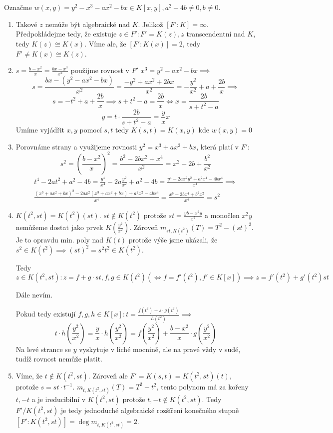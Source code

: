 \documentclass[12pt, a4paper]{article}
\begin{document}
\section{}
Označme $w(x,y)=y^2-x^3-ax^2-bx \in K[x,y], a^2-4b \neq 0, b \neq 0$.
\begin{enumerate}[label=(\alph*)]
    \item Takové $z$ nemůže být algebraické nad $K$. Jelikož $[F':K]= \infty $. Předpokládejme tedy, že existuje $z \in F': F'=K(z), z$ transcendentní nad $K$, tedy $K(z) \cong K(x)$. Víme ale, že $[F':K(x)]=2$, tedy $F' \neq K(x) \cong K(z)$.

    \item $s = \frac{b-x^2}{x} = \frac{bx-x^3}{x^2}$ použijme rovnost v $F'$ $x^3=y^2-ax^2-bx \implies$
    \[s = \frac{bx-(y^2-ax^2-bx)}{x^2} = \frac{-y^2+ax^2+2bx}{x^2}=-\frac{y^2}{x^2}+a+\frac{2b}{x} \implies
    \]
    \[
    s = -t^2+a+\frac{2b}{x} \implies s+t^2-a = \frac{2b}{x} \iff x = \frac{2b}{s+t^2-a}
    \]
    \[
    y = t\cdot \frac{2b}{s+t^2-a} = \frac{y}{x} x
    \]
    Umíme vyjádřit $x,y$ pomocí $s,t$ tedy $K(s,t)=K(x,y)$ kde $w(x,y)=0$
    \item Porovnáme strany a využijeme rovnosti $y^2 =x^3+ax^2+bx$, která platí v $F'$:
    \[
    s^2 = \left(\frac{b-x^2}{x}\right)^2 = \frac{b^2-2bx^2+x^4}{x^2} = x^2-2b+\frac{b^2}{x^2}
    \]
    \begin{gather*}
    t^4-2at^2+a^2-4b=\frac{y^4}{x^4}-2a\frac{y^2}{x^2} + a^2-4b = \frac{y^4-2ax^2y^2+a^2x^4-4bx^4}{x^4} \implies\\
    \frac{(x^3+ax^2+bx)^2-2ax^2(x^3+ax^2+bx)+a^2x^2-4bx^4}{x^4} = \frac{x^6-2bx^4+b^2x^2}{x^4} = s^2
    \end{gather*}

    \item $K(t^2,st)=K(t^2)(st)$. $st \notin K(t^2)$ protože $st=\frac{yb-x^2y}{x^2}$ a monočlen $x^2y$ nemůžeme dostat jako prvek $K(\frac{y^2}{x^2})$. Zároveň $m_{st,K(t^2)}(T) = T^2-(st)^2$. Je to opravdu min. poly nad $K(t)$ protože výše jsme ukázali, že $s^2 \in K(t^2)\implies (st)^2=s^2t^2 \in K(t^2)$.

    Tedy $z \in K(t^2,st): z = f+g\cdot st, f,g \in K(t^2) (\iff f = f'(t^2), f' \in K[x]) \implies z = f'(t^2)+g'(t^2)st$

    Dále nevím.

    Pokud tedy existují $f,g,h \in K[x]: t = \frac{f(t^2)+s\cdot g(t^2)}{h(t^2)} \implies$
    \[t \cdot h\left(\frac{y^2}{x^2}\right)=\frac{y}{x} \cdot h\left(\frac{y^2}{x^2}\right) = f\left(\frac{y^2}{x^2}\right)+\frac{b-x^2}{x} \cdot g\left(\frac{y^2}{x^2}\right)\]
    Na levé strance se $y$ vyskytuje v liché mocnině, ale na pravé vždy v sudé, tudíž rovnost nemůže platit.
    \item Víme, že $t \notin K(t^2,st)$. Zároveň ale $F'=K(s,t)=K(t^2,st)(t)$, protože $s=st\cdot t^{-1}$. $m_{t,K(t^2,st)}(T)=T^2-t^2$, tento polynom má za kořeny $t,-t$ a je ireducibilní v $K(t^2,st)$ protože $t,-t \notin K(t^2,st)$. Tedy $F'/K(t^2,st)$ je tedy jednoduché algebraické rozšíření konečného stupně $[F':K(t^2,st)]=\deg m_{t,K(t^2,st)} = 2$.
\end{enumerate}
\end{document}
